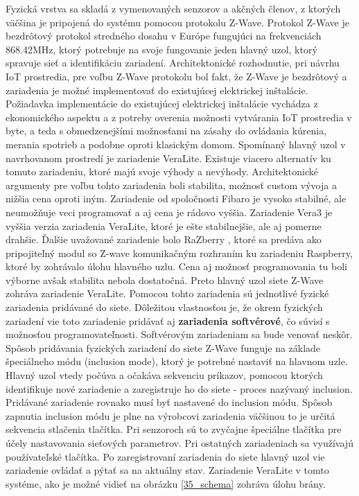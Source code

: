 Fyzická vrstva sa skladá z vymenovaných senzorov a akčných členov, z ktorých väčšina je pripojená do systému pomocou protokolu Z-Wave. Protokol Z-Wave je bezdrôtový protokol stredného dosahu v Európe fungujúci na frekvenciách 868.42MHz,   ktorý potrebuje na svoje fungovanie jeden hlavný uzol, ktorý spravuje sieť a identifikáciu zariadení. Architektonické rozhodnutie, pri návrhu IoT prostredia, pre voľbu Z-Wave protokolu bol fakt, že Z-Wave je bezdrôtový a zariadenia je možné implementovať do existujúcej elektrickej inštalácie. Požiadavka implementácie do existujúcej elektrickej inštalácie vychádza z ekonomického aspektu a z potreby overenia možnosti vytvárania IoT prostredia v byte, a teda s obmedzenejšími možnosťami na zásahy do ovládania kúrenia, merania spotrieb a podobne oproti klasickým domom. Spomínaný hlavný uzol v navrhovanom prostredí je zariadenie VeraLite. Existuje viacero alternatív ku tomuto zariadeniu, ktoré majú svoje výhody a nevýhody. Architektonické argumenty pre voľbu tohto zariadenia boli stabilita, možnosť custom vývoja a nižšia cena oproti iným. Zariadenie od spoločnosti Fibaro \cite{IOT25} je vysoko stabilné, ale neumožňuje veci programovať a aj cena je rádovo vyššia. Zariadenie Vera3 \cite{IOT27} je vyššia verzia zariadenia VeraLite, ktoré je ešte stabilnejšie, ale aj pomerne drahšie. Ďalšie uvažované zariadenie bolo RaZberry \cite{IOT26}, ktoré sa predáva ako pripojiteľný modul so Z-wave komunikačným rozhraním ku zariadeniu Raspberry, ktoré by zohrávalo úlohu hlavného uzlu. Cena aj možnosť programovania tu boli výborne avšak stabilita nebola dostatočná. Preto hlavný uzol siete Z-Wave zohráva zariadenie VeraLite. Pomocou tohto zariadenia sú jednotlivé fyzické zariadenia pridávané do siete. Dôležitou vlastnosťou je, že okrem fyzických zariadení vie toto zariadenie pridávať aj \textbf{zariadenia softvérové}, čo súvisí s možnosťou programovateľnosti. Softvérovým zariadeniam sa bude venovať neskôr. Spôsob pridávania fyzických zariadení do siete Z-Wave funguje na základe špeciálneho módu (inclusion mode), ktorý je potrebné nastaviť na hlavnom uzle. Hlavný uzol vtedy počúva a očakáva sekvenciu príkazov, pomocou ktorých identifikuje nové zariadenie a zaregistruje ho do siete - proces nazývaný inclusion. Pridávané zariadenie rovnako musí byť nastavené do inclusion módu. Spôsob zapnutia inclusion módu je plne na výrobcovi zariadenia väčšinou to je určitá sekvencia stlačenia tlačítka. Pri senzoroch sú to zvyčajne špeciálne tlačítka pre účely nastavovania sieťových parametrov. Pri ostatných zariadeniach sa využívajú používateľské tlačítka. Po zaregistrovaní zariadenia do siete hlavný uzol vie zariadenie ovládať a pýtať sa na aktuálny stav. Zariadenie VeraLite v tomto systéme, ako je možné vidieť na obrázku \ref{35_schema} zohráva úlohu brány. \\
